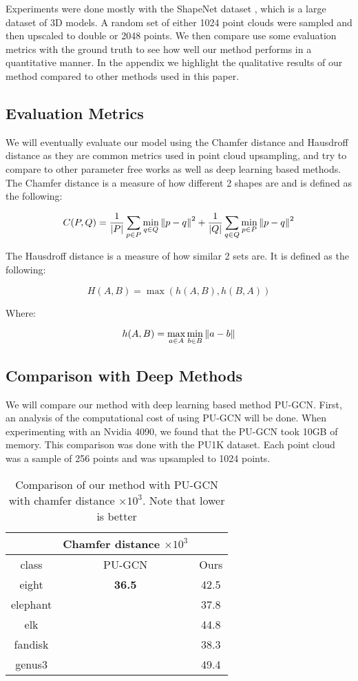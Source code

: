 Experiments were done mostly with the ShapeNet dataset \cite{shapenet}, which is a large dataset of 3D models. 
A random set of either 1024 point clouds were sampled and then upscaled to double or 2048 points.
We then compare use some evaluation metrics with the ground truth to see how well our method performs in a quantitative manner.
In the appendix we highlight the qualitative results of our method compared to other methods used in this paper.


\subsection{Evaluation Metrics}

We will eventually evaluate our model using the Chamfer distance and Hausdroff distance as they are common metrics used in point cloud upsampling, and try to compare to other parameter free works as well as deep learning based methods.
The Chamfer distance is a measure of how different 2 shapes are and is defined as the following:

$$ C(P, Q) = \dfrac{1}{|P|} \sum\limits_{p \in P} \min_{q \in Q} \left\lVert p - q\right\rVert^2 +  \dfrac{1}{|Q|} \sum\limits_{q \in Q} \min_{p \in P} \left\lVert p - q\right\rVert^2 \label{eq:chamfer}$$

The Hausdroff distance is a measure of how similar 2 sets are. It is defined as the following:

$$ H(A, B) = \max(h(A, B), h(B, A))\label{eq:hausdroff}$$

Where:

$$h(A, B) = \max_{a \in A} \min_{b \in B} \left\lVert a - b\right\rVert$$

\subsection{Comparison with Deep Methods}

We will compare our method with deep learning based method PU-GCN\cite{PU-GCN}.
First, an analysis of the computational cost of using PU-GCN will be done. 
When experimenting with an Nvidia 4090, we found that the PU-GCN took 10GB of memory.
This comparison was done with the PU1K dataset. Each point cloud was a sample of 256 points and was upsampled to 1024 points. 

\begin{table}[H]
\centering
\begin{tabular}{ccc}
	& Chamfer distance $\times 10^3$ &\\
	\hline
	class & PU-GCN & Ours \\
	\hline
	eight & \textbf{36.5} & {42.5} \\ 
	elephant & {} & {37.8} \\
	elk & {} & {44.8} \\  
	fandisk & {} & {38.3} \\  
	genus3 & {} & {49.4}  \\
\end{tabular}
\caption{Comparison of our method with PU-GCN with chamfer distance $\times 10^3$. Note that lower is better}
\end{table}


